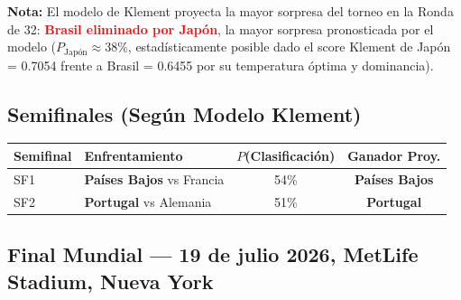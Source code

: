 \documentclass[11pt,a4paper]{article}
\begin{document}
\vspace{0.4cm}
\textbf{Nota:} El modelo de Klement proyecta la mayor sorpresa del torneo en la Ronda de 32: 
\textcolor{red}{\textbf{Brasil eliminado por Japón}}, la mayor sorpresa pronosticada por el 
modelo ($P_{\text{Japón}} \approx 38\%$, estadísticamente posible dado el score Klement de 
Japón = 0.7054 frente a Brasil = 0.6455 por su temperatura óptima y dominancia).

\subsection{Semifinales (Según Modelo Klement)}

\begin{center}
\begin{tabular}{@{}llcc@{}}
\toprule
\textbf{Semifinal} & \textbf{Enfrentamiento} & \textbf{$P$(Clasificación)} & \textbf{Ganador Proy.} \\
\midrule
\rowcolor{tablerow}
SF1 & \textbf{Países Bajos} vs Francia & 54\% & \textbf{Países Bajos} \\
SF2 & \textbf{Portugal} vs Alemania & 51\% & \textbf{Portugal} \\
\bottomrule
\end{tabular}
\end{center}

\subsection{Final Mundial — 19 de julio 2026, MetLife Stadium, Nueva York}
\end{document}
